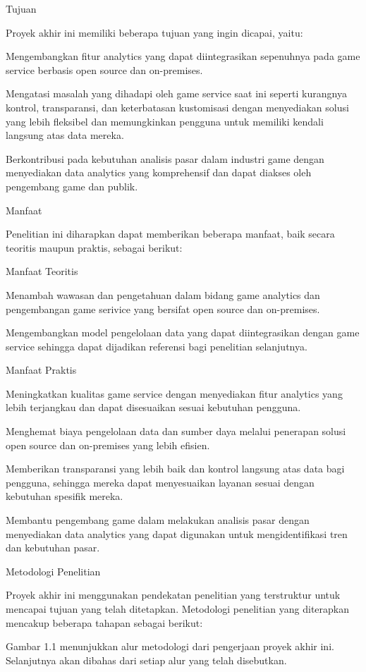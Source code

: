 Tujuan

Proyek akhir ini memiliki beberapa tujuan yang ingin dicapai, yaitu:

Mengembangkan fitur analytics yang dapat diintegrasikan sepenuhnya pada game service berbasis open source dan on-premises.

Mengatasi masalah yang dihadapi oleh game service saat ini seperti kurangnya kontrol, transparansi, dan keterbatasan kustomisasi dengan menyediakan solusi yang lebih fleksibel dan memungkinkan pengguna untuk memiliki kendali langsung atas data mereka.

Berkontribusi pada kebutuhan analisis pasar dalam industri game dengan menyediakan data analytics yang komprehensif dan dapat diakses oleh pengembang game dan publik.

Manfaat

Penelitian ini diharapkan dapat memberikan beberapa manfaat, baik secara teoritis maupun praktis, sebagai berikut:

Manfaat Teoritis

Menambah wawasan dan pengetahuan dalam bidang game analytics dan pengembangan game serivice yang bersifat open source dan on-premises.

Mengembangkan model pengelolaan data yang dapat diintegrasikan dengan game service sehingga dapat dijadikan referensi bagi penelitian selanjutnya.

Manfaat Praktis

Meningkatkan kualitas game service dengan menyediakan fitur analytics yang lebih terjangkau dan dapat disesuaikan sesuai kebutuhan pengguna.

Menghemat biaya pengelolaan data dan sumber daya melalui penerapan solusi open source dan on-premises yang lebih efisien.

Memberikan transparansi yang lebih baik dan kontrol langsung atas data bagi pengguna, sehingga mereka dapat menyesuaikan layanan sesuai dengan kebutuhan spesifik mereka.

Membantu pengembang game dalam melakukan analisis pasar dengan menyediakan data analytics yang dapat digunakan untuk mengidentifikasi tren dan kebutuhan pasar.

Metodologi Penelitian

Proyek akhir ini menggunakan pendekatan penelitian yang terstruktur untuk mencapai tujuan yang telah ditetapkan. Metodologi penelitian yang diterapkan mencakup beberapa tahapan sebagai berikut:

Gambar 1.1 menunjukkan alur metodologi dari pengerjaan proyek akhir ini. Selanjutnya akan dibahas dari setiap alur yang telah disebutkan.


